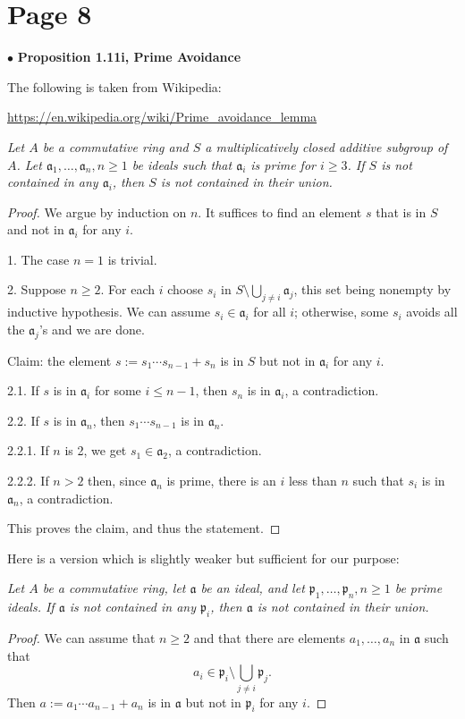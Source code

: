 \documentclass[12pt]{article}
\newcommand{\mf}{\mathfrak}
\newcommand{\bu}{\bullet}
\begin{document}
\section{Page 8}%

$\bu$ \textbf{\Large Proposition 1.11i, Prime Avoidance}%

The following is taken from Wikipedia:

\href{https://en.wikipedia.org/wiki/Prime_avoidance_lemma}{https://en.wikipedia.org/wiki/Prime\_avoidance\_lemma}

\emph{Let $A$ be a commutative ring and $S$ a multiplicatively closed additive subgroup of $A$. Let $\mf a_1,\dots,\mf a_n,n\ge1$ be ideals such that $\mf a_i$ is prime for $i\ge3$. If $S$ is not contained in any $\mf a_i$, then $S$ is not contained in their union.}

\begin{proof} 
We argue by induction on $n$. It suffices to find an element $s$ that is in $S$ and not in $\mf a_i$ for any $i$. 

1. The case $n=1$ is trivial. 

2. Suppose $n\ge2$. For each $i$ choose $s_i$ in $S\setminus\bigcup_{j \ne i}\mf a_j$, this set being nonempty by inductive hypothesis. We can assume $s_i \in \mf a_i$ for all $i$; otherwise, some $s_i$ avoids all the $\mf a_j$'s and we are done. 

Claim: the element $s:=s_1\cdots s_{n-1}+s_n$ is in $S$ but not in $\mf a_i$ for any $i$. 

2.1. If $s$ is in $\mf a_i$ for some $i\le n-1$, then $s_n$ is in $\mf a_i$, a contradiction. 

2.2. If $s$ is in $\mf a_n$, then $s_1\cdots s_{n-1}$ is in $\mf a_n$. 

2.2.1. If $n$ is 2, we get $s_1\in \mf a_2$, a contradiction.

2.2.2. If $n>2$ then, since $\mf a_n$ is prime, there is an $i$ less than $n$ such that $s_i$ is in $\mf a_n$, a contradiction.

This proves the claim, and thus the statement. 
\end{proof}

Here is a version which is slightly weaker but sufficient for our purpose:

\emph{Let $A$ be a commutative ring, let $\mf a$ be an ideal, and let $\mf p_1,\dots,\mf p_n,n\ge1$ be prime ideals. If $\mf a$ is not contained in any $\mf p_i$, then $\mf a$ is not contained in their union.}

\begin{proof} 
We can assume that $n\ge2$ and that there are elements $a_1,\dots,a_n$ in $\mf a$ such that 
$$
a_i\in\mf p_i\setminus\bigcup_{j \ne i}\mf p_j.
$$ 
Then $a:=a_1\cdots a_{n-1}+a_n$ is in $\mf a$ but not in $\mf p_i$ for any $i$.
\end{proof}
\end{document}
